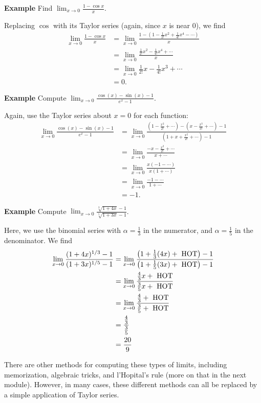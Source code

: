 \documentclass[a4paper]{book}
\begin{document}
\begin{sloppypar}
\textbf{Example} Find $\displaystyle \lim_{x\rightarrow 0} \frac{1-\cos x}{x}$. 
\begin{examplebox}
Replacing $\cos$ with its Taylor series (again, since $x$ is near 0), we find
\begin{align*} 
\lim_{x \rightarrow 0} \frac{1-\cos x}{x} &= \lim_{x \rightarrow 0} \frac{1-\left(1-\frac{1}{2!}x^2 + \frac{1}{4!}x^4 - \dotsb \right)}{x} \\
&= \lim_{x \rightarrow 0} \frac{\frac{1}{2!}x^2 - \frac{1}{4!}x^4 + \dotsb}{x} \\
&= \lim_{x \rightarrow 0} \frac{1}{2!}x - \frac{1}{4!}x^3 + \dotsb \\
&= 0. 
\end{align*}
\end{examplebox}

\textbf{Example} Compute $\displaystyle \lim_{x\rightarrow 0} \frac{\cos(x)-\sin(x)-1}{e^x-1}$. 
\begin{examplebox}
Again, use the Taylor series about $x=0$ for each function: 
\begin{align*}
\lim_{x \rightarrow 0} \frac{\cos(x)-\sin(x)-1}{e^x-1} &= \lim_{x \rightarrow 0} \frac{(1-\frac{x^2}{2!}+\dotsb)-(x-\frac{x^3}{3!}+\dotsb)-1}{(1+x+\frac{x^2}{2!}+\dotsb)-1} \\
&= \lim_{x\rightarrow 0}\frac{-x-\frac{x^2}{2!}+\dotsb}{x+\dotsb} \\
&= \lim_{x \rightarrow 0} \frac{x(-1-\dotsb)}{x(1+\dotsb)} \\
&= \lim_{x \rightarrow 0} \frac{-1-\dotsb}{1+\dotsb} \\
&= -1.
\end{align*}
\end{examplebox}

\textbf{Example} Compute $\displaystyle \lim_{x \rightarrow 0} \frac{\sqrt[3]{1+4x} - 1}{\sqrt[5]{1+3x} - 1}$.
\begin{examplebox}
Here, we use the binomial series with $\alpha = \frac{1}{3}$ in the numerator, and $\alpha = \frac{1}{5}$ in the denominator. We find
\begin{align*}
\lim_{x \rightarrow 0} \frac{(1+4x)^{1/3}- 1}{(1+3x)^{1/5} - 1} &= \lim_{x \rightarrow 0} \frac{\left(1+\frac{1}{3}(4x) + \hbox{ HOT}\right)-1}{\left(1+\frac{1}{5}(3x) + \hbox{ HOT}\right) - 1} \\
&= \lim_{x \rightarrow 0} \frac{\frac{4}{3}x + \hbox{ HOT}}{\frac{3}{5}x + \hbox{ HOT}} \\
&= \lim_{x \rightarrow 0} \frac{\frac{4}{3} + \hbox{ HOT}}{\frac{3}{5} + \hbox{ HOT}} \\
&= \frac{\frac{4}{3}}{\frac{3}{5}} \\
& = \frac{20}{9}
\end{align*}
\end{examplebox}
There are other methods for computing these types of limits, including memorization, algebraic tricks, and l'Hopital's rule (more on that in the next module). However, in many cases, these different methods can all be replaced by a simple application of Taylor series.


\end{sloppypar}
\end{document}
